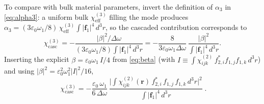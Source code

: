 \documentclass[11pt,a4paper]{article}
\newcommand{\eps}{\varepsilon}
\newcommand{\bvec}[1]{\mathbf{#1}}
\newcommand{\f}{\bvec{f}}
\newcommand{\ri}{\bvec{r}}
\newcommand{\dthreer}{\,d^{3}r}
\newcommand{\chitwo}{\chi^{(2)}}
\newcommand{\chithree}{\chi^{(3)}}
\newcommand{\Dom}{\Delta\omega}
\begin{document}
\bigskip

To compare with bulk material parameters, invert the definition of
$\alpha_3$ in \eqref{eq:alpha3}: a uniform bulk $\chithree_{\text{eff}}$
filling the mode produces
$\alpha_3=(3\eps_0\omega_1/8)\,\chithree_{\text{eff}}\!\int\!|\f_1|^4\dthreer$,
so the cascaded contribution corresponds to
\begin{equation}
  \chithree_{\text{casc}}=-\frac{|\beta|^2/\Dom}{(3\eps_0\omega_1/8)\!\int\!|\f_1|^4\dthreer}
                       =-\frac{8}{3\eps_0\omega_1\Dom}\,
                            \frac{|\beta|^2}{\int|\f_1|^4\dthreer}.
\end{equation}
Inserting the explicit $\beta=\eps_0\omega_1\,I/4$ from \eqref{eq:beta} (with
$I\equiv\int\chitwo_{ijk}\,f_{2,i}^*f_{1,j}f_{1,k}\dthreer$) and using
$|\beta|^2=\eps_0^2\omega_1^2|I|^2/16$,
\begin{equation}
  \boxed{\;\chithree_{\text{casc}}=-\frac{\eps_0\,\omega_1}{6\,\Dom}\,
       \frac{\bigl|\!\int\!\chitwo_{ijk}(\ri)\,f_{2,i}^*\,f_{1,j}\,f_{1,k}\dthreer\bigr|^{2}}
            {\int|\f_1|^4\dthreer}\;.}
\label{eq:chi3casc}
\end{equation}
\end{document}
